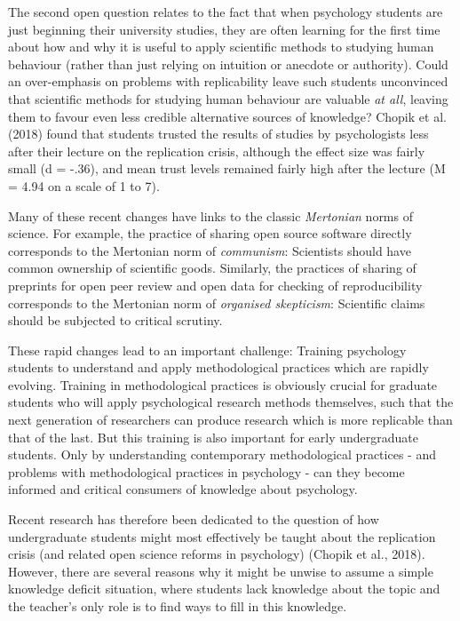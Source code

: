 \documentclass[
  english,
  man,mask,floatsintext]{apa6}
\begin{document}
The second open question relates to the fact that when psychology students are just beginning their university studies, they are often learning for the first time about how and why it is useful to apply scientific methods to studying human behaviour (rather than just relying on intuition or anecdote or authority). Could an over-emphasis on problems with replicability leave such students unconvinced that scientific methods for studying human behaviour are valuable \emph{at all}, leaving them to favour even less credible alternative sources of knowledge? Chopik et al. (2018) found that students trusted the results of studies by psychologists less after their lecture on the replication crisis, although the effect size was fairly small (d = -.36), and mean trust levels remained fairly high after the lecture (M = 4.94 on a scale of 1 to 7).

Many of these recent changes have links to the classic \emph{Mertonian} norms of science. For example, the practice of sharing open source software directly corresponds to the Mertonian norm of \emph{communism}: Scientists should have common ownership of scientific goods. Similarly, the practices of sharing of preprints for open peer review and open data for checking of reproducibility corresponds to the Mertonian norm of \emph{organised skepticism}: Scientific claims should be subjected to critical scrutiny.

These rapid changes lead to an important challenge: Training psychology students to understand and apply methodological practices which are rapidly evolving. Training in methodological practices is obviously crucial for graduate students who will apply psychological research methods themselves, such that the next generation of researchers can produce research which is more replicable than that of the last. But this training is also important for early undergraduate students. Only by understanding contemporary methodological practices - and problems with methodological practices in psychology - can they become informed and critical consumers of knowledge about psychology.

Recent research has therefore been dedicated to the question of how undergraduate students might most effectively be taught about the replication crisis (and related open science reforms in psychology) (Chopik et al., 2018). However, there are several reasons why it might be unwise to assume a simple knowledge deficit situation, where students lack knowledge about the topic and the teacher's only role is to find ways to fill in this knowledge.
\end{document}
